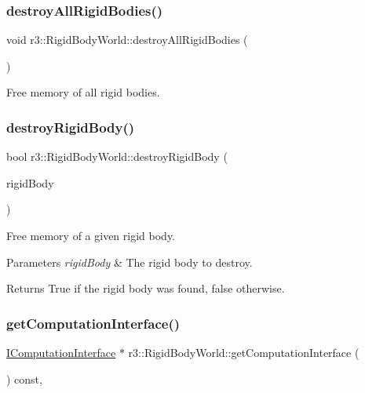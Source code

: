 \subsubsection{\texorpdfstring{destroy\+All\+Rigid\+Bodies()}{destroyAllRigidBodies()}}
{\footnotesize\ttfamily void r3\+::\+Rigid\+Body\+World\+::destroy\+All\+Rigid\+Bodies (\begin{DoxyParamCaption}{ }\end{DoxyParamCaption})}



Free memory of all rigid bodies. 

\mbox{\label{classr3_1_1_rigid_body_world_a1a203fb9675eba999e0f59c23e597111}} 
\subsubsection{\texorpdfstring{destroy\+Rigid\+Body()}{destroyRigidBody()}}
{\footnotesize\ttfamily bool r3\+::\+Rigid\+Body\+World\+::destroy\+Rigid\+Body (\begin{DoxyParamCaption}\item[{\mbox{\hyperlink{classr3_1_1_rigid_body}{Rigid\+Body}} $\ast$}]{rigid\+Body }\end{DoxyParamCaption})}



Free memory of a given rigid body. 


\begin{DoxyParams}{Parameters}
{\em rigid\+Body} & The rigid body to destroy. \\
\hline
\end{DoxyParams}
\begin{DoxyReturn}{Returns}
True if the rigid body was found, false otherwise. 
\end{DoxyReturn}
\mbox{\label{classr3_1_1_rigid_body_world_ac25b39a5b15666d99f42b68f29f8a97b}} 
\subsubsection{\texorpdfstring{get\+Computation\+Interface()}{getComputationInterface()}}
{\footnotesize\ttfamily \mbox{\hyperlink{classr3_1_1_i_computation_interface}{I\+Computation\+Interface}} $\ast$ r3\+::\+Rigid\+Body\+World\+::get\+Computation\+Interface (\begin{DoxyParamCaption}{ }\end{DoxyParamCaption}) const\hspace{0.3cm}{\ttfamily [override]}, {\ttfamily [virtual]}}



